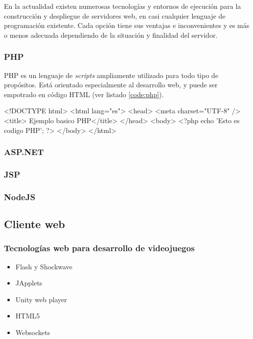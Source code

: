 En la actualidad existen numerosas tecnologías y entornos de ejecución para la construcción y despliegue de servidores web, en casi cualquier lenguaje de programación existente. Cada opción tiene sus ventajas e inconvenientes y es más o menos adecuada dependiendo de la situación y finalidad del servidor.

\subsubsection{PHP}

PHP es un lenguaje de {\it scripts} ampliamente utilizado para todo tipo de propósitos. Está orientado especialmente al desarrollo web, y puede ser empotrado en código \acs{HTML} (ver listado \ref{code:php}).

\begin{listing}[language=html, caption={Ejemplo de inclusión de código PHP en HTML}, label=code:php]
<!DOCTYPE html>
<html lang="es">
    <head>
        <meta charset="UTF-8" />
        <title> Ejemplo basico PHP</title>
    </head>
    <body>
        <?php
            echo 'Esto es codigo PHP';
        ?>
    </body>
</html>
\end{listing}

\subsubsection{ASP.NET}

\subsubsection{JSP}

\subsubsection{NodeJS}

\subsection{Cliente web}
\label{sec::desarrollo-juegos}

\subsubsection{Tecnologías web para desarrollo de videojuegos}


\begin{itemize}
\item{Flash y Shockwave}

\item{JApplets}

\item{Unity web player}

\item{HTML5}

\item{Websockets}
  
\end{itemize}


